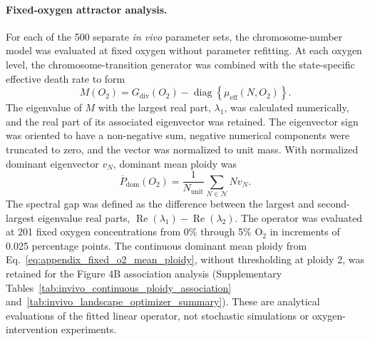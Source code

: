 \documentclass[11pt]{article}
\begin{document}
\paragraph{Fixed-oxygen attractor analysis.}
For each of the 500 separate \textit{in vivo} parameter sets, the chromosome-number model was evaluated at fixed oxygen without parameter refitting. At each oxygen level, the chromosome-transition generator was combined with the state-specific effective death rate to form
\begin{equation}
M(O_2)=G_{\mathrm{div}}(O_2)-\operatorname{diag}\!\left\{\mu_{\mathrm{eff}}(N,O_2)\right\}.
\label{eq:appendix_fixed_o2_operator}
\end{equation}
The eigenvalue of $M$ with the largest real part, $\lambda_1$, was calculated numerically, and the real part of its associated eigenvector was retained. The eigenvector sign was oriented to have a non-negative sum, negative numerical components were truncated to zero, and the vector was normalized to unit mass. With normalized dominant eigenvector $v_N$, dominant mean ploidy was
\begin{equation}
\overline P_{\mathrm{dom}}(O_2)=\frac{1}{N_{\mathrm{unit}}}\sum_{N\in\mathcal N}Nv_N.
\label{eq:appendix_fixed_o2_mean_ploidy}
\end{equation}
The spectral gap was defined as the difference between the largest and second-largest eigenvalue real parts, $\operatorname{Re}(\lambda_1)-\operatorname{Re}(\lambda_2)$. The operator was evaluated at 201 fixed oxygen concentrations from 0\% through 5\% O$_2$ in increments of 0.025 percentage points. The continuous dominant mean ploidy from Eq.~\eqref{eq:appendix_fixed_o2_mean_ploidy}, without thresholding at ploidy 2, was retained for the Figure 4B association analysis (Supplementary Tables~\ref{tab:invivo_continuous_ploidy_association} and~\ref{tab:invivo_landscape_optimizer_summary}). These are analytical evaluations of the fitted linear operator, not stochastic simulations or oxygen-intervention experiments.
\end{document}
